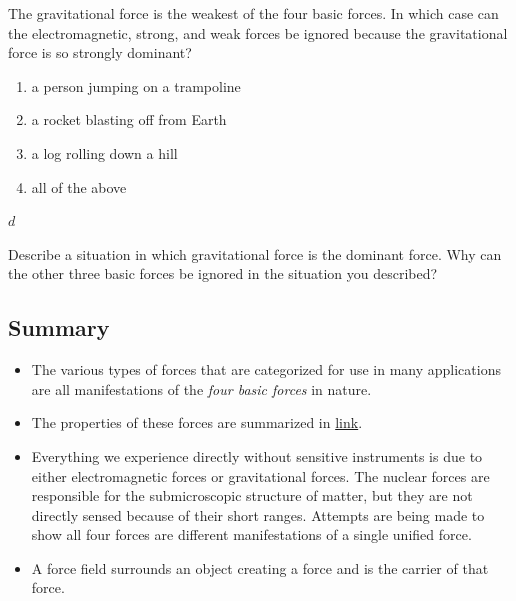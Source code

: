 \documentclass[
]{book}
\providecommand{\tightlist}{%
  \setlength{\itemsep}{0pt}\setlength{\parskip}{0pt}}
\newenvironment{ap-test-prep}{}{}
\begin{document}
\begin{ap-test-prep}
\hypertarget{fs-id1656257}{}
\leavevmode\hypertarget{fs-id1472000}{}%
The gravitational force is the weakest of the four basic forces. In
which case can the electromagnetic, strong, and weak forces be ignored
because the gravitational force is so strongly dominant?

\begin{enumerate}
\def\labelenumi{\alph{enumi}.}
\tightlist
\item
  a person jumping on a trampoline
\item
  a rocket blasting off from Earth
\item
  a log rolling down a hill
\item
  all of the above
\end{enumerate}

\leavevmode\hypertarget{fs-id2166894}{}%
\(d\)

\hypertarget{fs-id1338709}{}
\leavevmode\hypertarget{fs-id1374823}{}%
Describe a situation in which gravitational force is the dominant force.
Why can the other three basic forces be ignored in the situation you
described?

\end{ap-test-prep}

\hypertarget{fs-id1993313-summary}{}
\hypertarget{summary-6}{%
\subsection{Summary}\label{summary-6}}

\begin{itemize}
\tightlist
\item
  \protect\hypertarget{import-auto-id2055006}{}{The various types of forces that are categorized for use in many
  applications are all manifestations of the \emph{four basic forces} in
  nature.}
\item
  \protect\hypertarget{import-auto-id1355832}{}{The properties of these forces are summarized in
  \protect\hyperlink{import-auto-id1588108}{link}.}
\item
  \protect\hypertarget{import-auto-id1381444}{}{Everything we experience directly without sensitive instruments is
  due to either electromagnetic forces or gravitational forces. The
  nuclear forces are responsible for the submicroscopic structure of
  matter, but they are not directly sensed because of their short
  ranges. Attempts are being made to show all four forces are
  different manifestations of a single unified
  force.}
\item
  \protect\hypertarget{import-auto-id3191620}{}{A force field surrounds an object creating a force and is the
  carrier of that force.}
\end{itemize}
\end{document}
